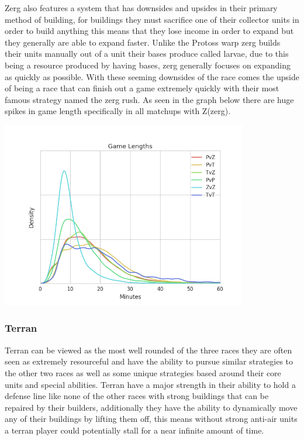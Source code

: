 \documentclass[a4paper,12pt]{report}
\begin{document}
Zerg also features a system that has downsides and upsides in their primary method of building, for buildings they must sacrifice one of their collector units in order to build anything this means that they lose income in order to expand but they generally are able to expand faster. Unlike the Protoss warp  zerg builds their units manually out of a unit their bases produce called larvae, due to this being a resource produced by having bases, zerg generally focuses on expanding as quickly as possible. With these seeming downsides of the race comes the upside of being a race that can finish out a game extremely quickly with their most famous strategy named the zerg rush. As seen in the graph below there are huge spikes in game length specifically in all matchups with Z(zerg).

\begin{center}
    \captionsetup{type=figure}
    \includegraphics[width=.5\linewidth]{media/GameLength.png}
\end{center}

\subsubsection{Terran}

Terran can be viewed as the most well rounded of the three races they are often seen as extremely resourceful and have the ability to pursue similar strategies to the other two races as well as some unique strategies based around their core units and special abilities. Terran have a major strength in their ability to hold a defense line like none of the other races with strong buildings that can be repaired by their builders, additionally they have the ability to dynamically move any of their buildings by lifting them off, this means without strong anti-air units a terran player could potentially stall for a near infinite amount of time.
\end{document}
